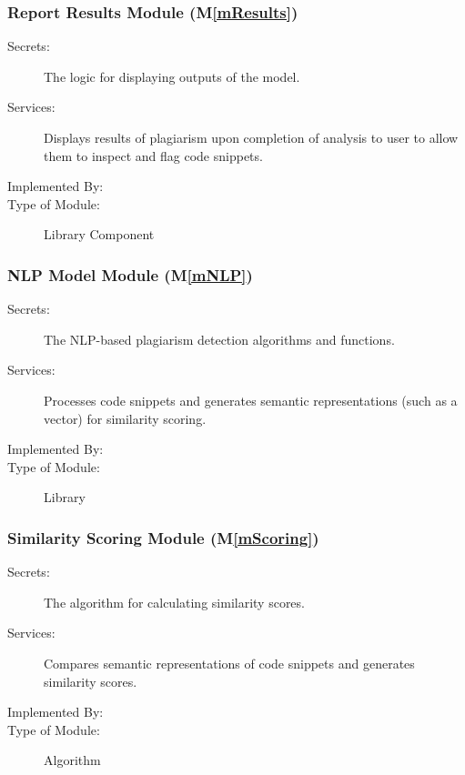 \documentclass[12pt, titlepage]{article}
\newcommand{\mref}[1]{M\ref{#1}}
\begin{document}
\subsubsection{Report Results Module (\mref{mResults})}

\begin{description}
\item[Secrets:] The logic for displaying outputs of the model.
\item[Services:] Displays results of plagiarism upon completion of analysis
to user to allow them to inspect and flag code snippets.
\item[Implemented By:] \progname{}
\item[Type of Module:] Library Component
\end{description}

\subsubsection{NLP Model Module (\mref{mNLP})}

\begin{description}
\item[Secrets:] The NLP-based plagiarism detection algorithms and functions.
\item[Services:] Processes code snippets and generates semantic representations (such as a vector) 
for similarity scoring.
\item[Implemented By:] \progname{}
\item[Type of Module:] Library
\end{description}

\subsubsection{Similarity Scoring Module (\mref{mScoring})}

\begin{description}
\item[Secrets:] The algorithm for calculating similarity scores.
\item[Services:] Compares semantic representations of code snippets and generates similarity scores.
\item[Implemented By:] \progname{}
\item[Type of Module:] Algorithm
\end{description}


\end{document}
